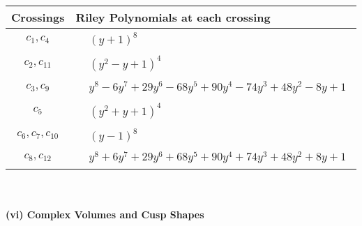 \documentclass[1p]{elsarticle_modified}
\theoremstyle{definition}
\begin{document}
\begin{tabular}{m{50pt}|m{274pt}}
Crossings & \hspace{64pt}Riley Polynomials at each crossing \\
\hline $$\begin{aligned}c_{1},c_{4}\end{aligned}$$&$\begin{aligned}
&(y+1)^8
\end{aligned}$\\
\hline $$\begin{aligned}c_{2},c_{11}\end{aligned}$$&$\begin{aligned}
&(y^2- y+1)^4
\end{aligned}$\\
\hline $$\begin{aligned}c_{3},c_{9}\end{aligned}$$&$\begin{aligned}
&y^8-6 y^7+29 y^6-68 y^5+90 y^4-74 y^3+48 y^2-8 y+1
\end{aligned}$\\
\hline $$\begin{aligned}c_{5}\end{aligned}$$&$\begin{aligned}
&(y^2+y+1)^4
\end{aligned}$\\
\hline $$\begin{aligned}c_{6},c_{7},c_{10}\end{aligned}$$&$\begin{aligned}
&(y-1)^8
\end{aligned}$\\
\hline $$\begin{aligned}c_{8},c_{12}\end{aligned}$$&$\begin{aligned}
&y^8+6 y^7+29 y^6+68 y^5+90 y^4+74 y^3+48 y^2+8 y+1
\end{aligned}$\\
\hline
\end{tabular}\\~\\
\newpage\flushleft \textbf{(vi) Complex Volumes and Cusp Shapes}
\end{document}
